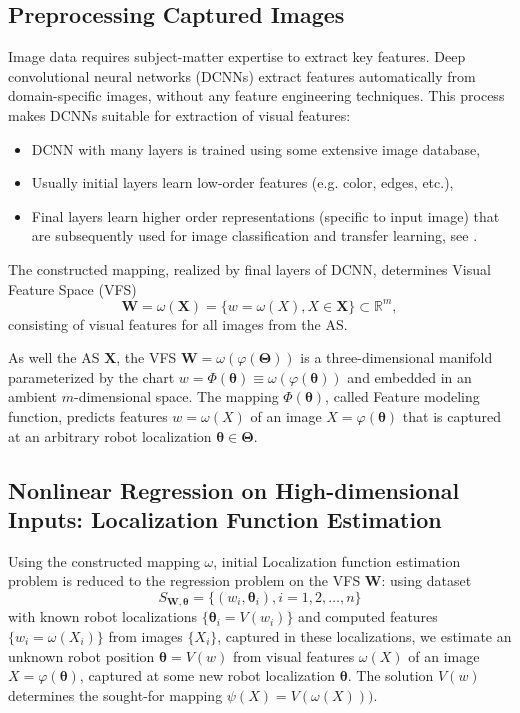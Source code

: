 \documentclass[conference]{IEEEtran} %
\def\mbW{\mathbf{W}}
\def\mbTheta{{\bm\Theta}}
\def\mbtheta{{\bm\theta}}
\def\mbX{\mathbf{X}}
\def\RR{\mathbb{R}}
\begin{document}
\subsection{Preprocessing Captured Images}
\label{sec3.1}
Image data requires subject-matter expertise to extract key features. Deep convolutional neural networks (DCNNs) extract features automatically from domain-specific images, without any feature engineering techniques. This process makes DCNNs suitable for extraction of visual features:
\begin{itemize}
\item DCNN with many layers is trained using some extensive image database,
\item Usually initial layers learn low-order features (e.g. color, edges, etc.),
\item Final layers learn higher order representations (specific to input image) that are subsequently used for image classification and transfer learning, see \cite{trans2}.
\end{itemize}

The constructed mapping, realized by final layers of DCNN, determines Visual Feature Space (VFS)
\begin{equation}
  \label{eq4}
  \mbW = \omega(\mbX) = \{w =\omega(X), X \in \mbX\} \subset \RR^m,
\end{equation}
consisting of visual features for all images from the AS.

As well the AS $\mbX$, the VFS $\mbW = \omega(\varphi(\mbTheta))$ is a three-dimensional manifold parameterized by the chart $w = \Phi(\mbtheta)  \equiv \omega(\varphi(\mbtheta))$ and embedded in an ambient $m$-dimensional space. The mapping $\Phi(\mbtheta)$, called Feature modeling function, predicts features $w = \omega(X)$ of an image $X = \varphi(\mbtheta)$ that is captured at an arbitrary robot localization $\mbtheta \in \mbTheta$.

\subsection{Nonlinear Regression on High-dimensional Inputs: Localization Function Estimation}
\label{sec3.2}

Using the constructed mapping $\omega$, initial Localization function estimation problem is reduced to the regression problem on the VFS $\mbW$: using dataset 
\begin{equation}
  \label{eq5}
  S_{\mathbf{W},\mbtheta} = \{(w_i, \mbtheta_i), i=1,2, \dots, n\}
\end{equation}
with known robot localizations $\{\mbtheta_i = V(w_i)\}$ and computed features $\{w_i = \omega(X_i)\}$ from  images $\{X_i\}$, captured in these localizations, we estimate an unknown robot position $\mbtheta = V(w)$ from visual features $\omega(X)$ of an image $X = \varphi(\mbtheta)$, captured at some new robot localization $\mbtheta$. The solution $V(w)$ determines the sought-for mapping $\psi(X) = V(\omega(X)))$.
\end{document}
